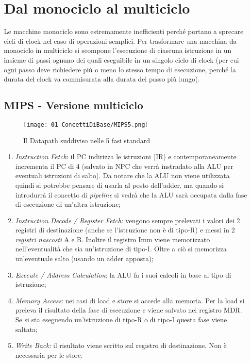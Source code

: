 
\section{Dal monociclo al multiciclo}

Le macchine monociclo sono estremamente inefficienti perché portano a sprecare cicli di clock nel caso di operazioni semplici. 
Per trasformare una macchina da monociclo in multiciclo si scompone l'esecuzione di ciascuna istruzione in un insieme di passi ognuno dei quali eseguibile in un singolo ciclo di clock (per cui ogni passo deve richiedere più o meno lo stesso tempo di esecuzione, perché la durata del clock va commisurata alla durata del passo più lungo). 


\subsection{MIPS - Versione multiciclo}

\begin{figure}[h]
    \centering
    \texttt{[image: 01-ConcettiDiBase/MIPS5.png]}
    \caption{Il Datapath suddiviso nelle 5 fasi standard}
\end{figure}


\begin{enumerate}
  \item \textit{Instruction Fetch}: il PC indirizza le istruzioni (IR) e contemporaneamente incrementa il PC di 4 (salvato in NPC che verrà instradato alla ALU per eventuali istruzioni di salto). Da notare che la ALU non viene utilizzata quindi si potrebbe pensare di usarla al posto dell'adder, ma quando si introdurrà il concetto di \textit{pipeline} si vedrà che la ALU sarà occupata dalla fase di esecuzione di un'altra istruzione;
  \item \textit{Instruction Decode / Register Fetch}: vengono sempre prelevati i valori dei 2 registri di destinazione (anche se l'istruzione non è di tipo-R) e messi in 2 \textit{registri nascosti} A e B. Inoltre il registro Imm viene memorizzato nell'eventualità che sia un'istruzione di tipo-I. Oltre a ciò si memorizza un'eventuale salto (usando un adder apposta);
  \item \textit{Execute / Address Calculation}: la ALU fa i suoi calcoli in base al tipo di istruzione;
  \item \textit{Memory Access}: nei casi di load e store si accede alla memoria. Per la load si preleva il risultato della fase di esecuzione e viene salvato nel registro MDR. Se si sta eseguendo un'istruzione di tipo-R o di tipo-I questa fase viene saltata;
  \item \textit{Write Back:} il risultato viene scritto sul registro di destinazione. Non è necessaria per le store.
\end{enumerate}

